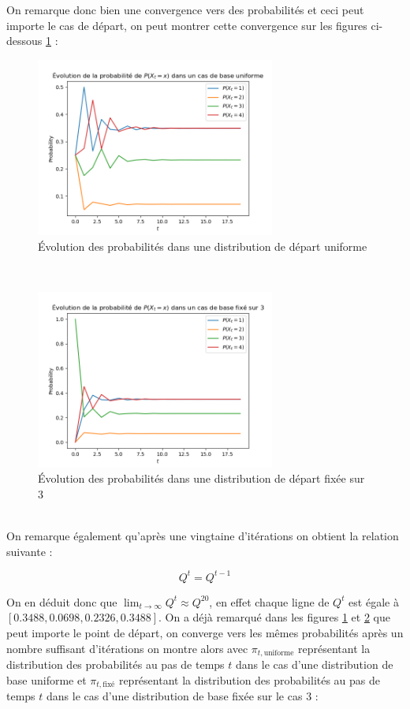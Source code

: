 On remarque donc bien une convergence vers des probabilités et ceci peut importe le cas de départ, on peut montrer cette convergence sur les figures ci-dessous \ref{fig:unif} :
\begin{figure}[h!]
  \centering
  \includegraphics[width=0.7\textwidth]{figs/evo_unif.png}
  \caption{Évolution des probabilités dans une distribution de départ uniforme}
  \label{fig:unif}
\end{figure}
\\
\begin{figure}[h!]
  \centering
  \includegraphics[width=0.7\textwidth]{figs/evo_fixed.png}
  \caption{Évolution des probabilités dans une distribution de départ fixée sur 3}
  \label{fig:fixed}
\end{figure}
\\
On remarque également qu'après une vingtaine d'itérations on obtient la relation suivante :

\begin{equation*}
  Q^t = Q^{t-1}
\end{equation*}

On en déduit donc que $\lim_{t \rightarrow \infty} Q^t \approx Q^{20} $, en effet chaque ligne de $Q^t$ est égale à $[0.3488 , 0.0698 , 0.2326 , 0.3488]$. On a déjà remarqué dans les figures \ref{fig:unif} et \ref{fig:fixed} que peut importe le 
point de départ, on converge vers les mêmes probabilités après un nombre suffisant d'itérations on montre alors avec $\pi_{t,\text{uniforme}}$ représentant la distribution des probabilités au pas de temps $t$ dans le cas d'une 
distribution de base uniforme et $\pi_{t,\text{fixé}}$ représentant la distribution des probabilités au pas de temps $t$ dans le cas d'une 
distribution de base fixée sur le cas $3$ :  

